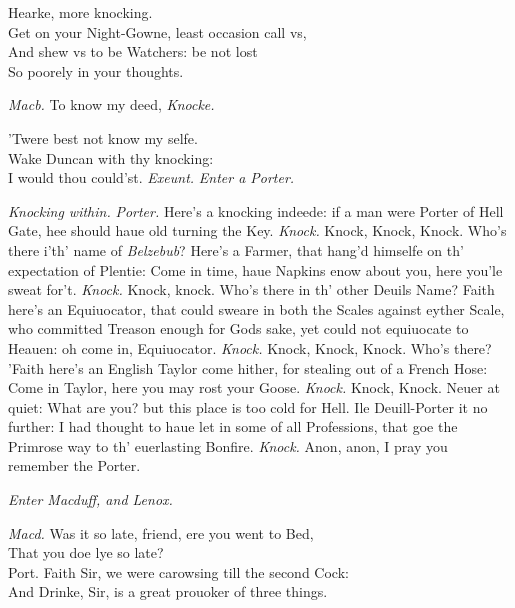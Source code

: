 \documentclass[12pt]{sides}
\newcommand{\clStageDir}[1]{\hspace*{\fill}\textit{#1}\hspace*{\fill}}
\newcommand{\elStageDir}[1]{\hfill\textit{#1}}
\newcommand{\dia}[1]{\hskip 15pt\textit{#1}\hskip 6pt}
\begin{document}
\begin{multicols}{2}
            Hearke, more knocking. \\ Get on your Night-Gowne, least occasion call vs, \\ And shew vs to be Watchers: be not lost \\ So poorely in your thoughts.

            \dia{Macb.} To know my deed, \clStageDir{Knocke.} \hspace{11pt}

            'Twere best not know my selfe. \\ Wake Duncan with thy knocking: \\I would thou could'st. \elStageDir{Exeunt.} \hspace{40pt}
            \clStageDir{Enter a Porter.}
            
            \elStageDir{Knocking within.}
            \dia{Porter.} Here's a knocking indeede: if a man were Porter of Hell Gate, hee should haue old turning the Key. \hspace{8pt} \textit{Knock.} \hspace{8pt} Knock, Knock, Knock. Who's there i'th' name of \textit{Belzebub}? Here's a Farmer, that hang'd himselfe on th' expectation of Plentie: Come in time, haue Napkins enow about you, here you'le sweat for't. \textit{Knock.} Knock, knock. Who's there in th' other Deuils Name? Faith here's an Equiuocator, that could sweare in both the Scales against eyther Scale, who committed Treason enough for Gods sake, yet could not equiuocate to Heauen: oh come in, Equiuocator. \hspace{8pt} \textit{Knock.} \hspace{8pt} Knock, Knock, Knock. Who's there? 'Faith here's an English Taylor come hither, for stealing out of a French Hose: Come in Taylor, here you may rost your Goose. \textit{Knock.} Knock, Knock. Neuer at quiet: What are you? but this place is too cold for Hell. Ile Deuill-Porter it no further: I had thought to haue let in some of all Professions, that goe the Primrose way to th' euerlasting Bonfire. \textit{Knock.} Anon, anon, I pray you remember the Porter.

            \clStageDir{Enter Macduff, and Lenox.}
            
            \dia{Macd.} Was it so late, friend, ere you went to Bed, \\ That you doe lye so late? \\   Port. Faith Sir, we were carowsing till the second Cock: \\ And Drinke, Sir, is a great prouoker of three things.


\end{multicols}
\end{document}
